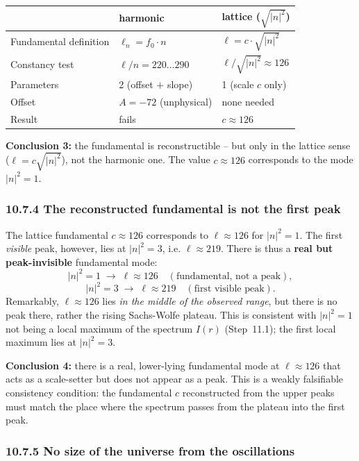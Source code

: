 \begin{center}
\begin{tabular}{p{4.5cm}p{3.5cm}p{3.5cm}}
\toprule
 & \textbf{harmonic} & \textbf{lattice ($\sqrt{|n|^2}$)} \\
\midrule
Fundamental definition & $\ell_n = f_0\cdot n$ & $\ell = c\cdot\sqrt{|n|^2}$ \\
Constancy test & $\ell/n = 220\ldots290$ & $\ell/\sqrt{|n|^2} \approx 126$ \\
Parameters & 2 (offset $+$ slope) & 1 (scale $c$ only) \\
Offset & $A = -72$ (unphysical) & none needed \\
Result & fails & $c \approx 126$ \\
\bottomrule
\end{tabular}
\end{center}

\textbf{Conclusion 3:} the fundamental is reconstructible -- but only
in the lattice sense ($\ell = c\sqrt{|n|^2}$), not the harmonic one.
The value $c \approx 126$ corresponds to the mode $|n|^2 = 1$.

\subsubsection*{10.7.4 The reconstructed fundamental is not the first peak}

The lattice fundamental $c \approx 126$ corresponds to $\ell \approx 126$
for $|n|^2 = 1$. The first \emph{visible} peak, however, lies at
$|n|^2 = 3$, i.e. $\ell \approx 219$. There is thus a \textbf{real but
peak-invisible} fundamental mode:
\[
  |n|^2 = 1 \;\to\; \ell \approx 126
  \quad(\text{fundamental, not a peak}),
\]
\[
  |n|^2 = 3 \;\to\; \ell \approx 219
  \quad(\text{first visible peak}).
\]
Remarkably, $\ell \approx 126$ lies \emph{in the middle of the
observed range}, but there is no peak there, rather the rising
Sachs-Wolfe plateau. This is consistent with $|n|^2=1$ not being a local
maximum of the spectrum $I(r)$ (Step~11.1); the first local maximum lies at
$|n|^2=3$.

\textbf{Conclusion 4:} there is a real, lower-lying fundamental mode at
$\ell \approx 126$ that acts as a scale-setter but does not appear as a
peak. This is a weakly falsifiable
consistency condition: the fundamental $c$ reconstructed from the upper
peaks must match the place where the spectrum passes from the plateau
into the first peak.

\subsubsection*{10.7.5 No size of the universe from the oscillations}

